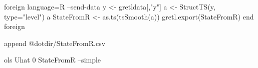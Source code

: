\begin{code}
foreign language=R --send-data
  y <- gretldata[,"y"]
  a <- StructTS(y, type="level")
  a
  StateFromR <- as.ts(tsSmooth(a))
  gretl.export(StateFromR)
end foreign

append @dotdir/StateFromR.csv

ols Uhat 0 StateFromR --simple
\end{code}




